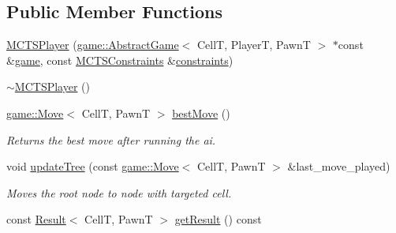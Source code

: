 \subsection*{Public Member Functions}
\begin{DoxyCompactItemize}
\item 
\hyperlink{classmcts_1_1_m_c_t_s_player_a7daa85ddaab8a7dab66b0f229629d37c}{M\+C\+T\+S\+Player} (\hyperlink{classgame_1_1_abstract_game}{game\+::\+Abstract\+Game}$<$ CellT, PlayerT, PawnT $>$ $\ast$const \&\hyperlink{classmcts_1_1_m_c_t_s_player_ae4ff52c6d9e13dc5801b53bb11e32a64}{game}, const \hyperlink{structmcts_1_1_m_c_t_s_constraints}{M\+C\+T\+S\+Constraints} \&\hyperlink{classmcts_1_1_m_c_t_s_player_a58cb7a7b1286e635d548ebe0405d79e6}{constraints})
\item 
\hyperlink{classmcts_1_1_m_c_t_s_player_aa32a16ae9072685c09042fa9ddf1bd8d}{$\sim$\+M\+C\+T\+S\+Player} ()
\item 
\hyperlink{structgame_1_1_move}{game\+::\+Move}$<$ CellT, PawnT $>$ \hyperlink{classmcts_1_1_m_c_t_s_player_a48340fed9c5730f0d64ca177682f575e}{best\+Move} ()
\begin{DoxyCompactList}\small\item\em Returns the best move after running the ai. \end{DoxyCompactList}\item 
void \hyperlink{classmcts_1_1_m_c_t_s_player_a02d0a6f2219decabb51ff9d8c4c9b355}{update\+Tree} (const \hyperlink{structgame_1_1_move}{game\+::\+Move}$<$ CellT, PawnT $>$ \&last\+\_\+move\+\_\+played)
\begin{DoxyCompactList}\small\item\em Moves the root node to node with targeted cell. \end{DoxyCompactList}\item 
const \hyperlink{structmcts_1_1_result}{Result}$<$ CellT, PawnT $>$ \hyperlink{classmcts_1_1_m_c_t_s_player_a7d307a84ff2225af4ae34b100f91275a}{get\+Result} () const
\end{DoxyCompactItemize}
